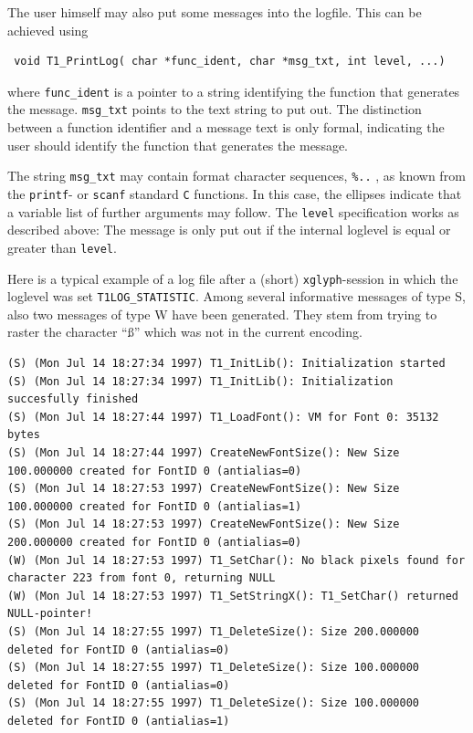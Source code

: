 The user himself may also put some messages into the logfile. This can be
achieved using
\precorr
\begin{verbatim}
 void T1_PrintLog( char *func_ident, char *msg_txt, int level, ...)
\end{verbatim}\postcorr
where \verb+func_ident+ is a pointer to a string identifying the function that
generates the message. \verb+msg_txt+ points to the text string to put
out. The distinction between a function identifier and a message text is only
formal, indicating the user should identify the function that generates the
message. 

The string \verb+msg_txt+ may contain format character sequences, \verb+%..+ ,
as known from the \verb+printf+- or \verb+scanf+ standard \verb+C+
functions. In this case, the ellipses indicate that a variable list of further
arguments may follow. The \verb+level+ specification works as
described above: The message is only put out if the internal loglevel is
equal or greater than \verb+level+. 

Here is a typical example of a log file after a (short)
\verb+xglyph+-session in which the loglevel was set
\verb+T1LOG_STATISTIC+. Among several informative messages of type S, also two
messages of type W have been generated. They stem from trying to
raster the character ``\ss'' which was not in the current encoding. 
\par\noindent
{%
\tiny
\begin{verbatim}
(S) (Mon Jul 14 18:27:34 1997) T1_InitLib(): Initialization started 
(S) (Mon Jul 14 18:27:34 1997) T1_InitLib(): Initialization succesfully finished 
(S) (Mon Jul 14 18:27:44 1997) T1_LoadFont(): VM for Font 0: 35132 bytes 
(S) (Mon Jul 14 18:27:44 1997) CreateNewFontSize(): New Size 100.000000 created for FontID 0 (antialias=0) 
(S) (Mon Jul 14 18:27:53 1997) CreateNewFontSize(): New Size 100.000000 created for FontID 0 (antialias=1) 
(S) (Mon Jul 14 18:27:53 1997) CreateNewFontSize(): New Size 200.000000 created for FontID 0 (antialias=0) 
(W) (Mon Jul 14 18:27:53 1997) T1_SetChar(): No black pixels found for character 223 from font 0, returning NULL 
(W) (Mon Jul 14 18:27:53 1997) T1_SetStringX(): T1_SetChar() returned NULL-pointer! 
(S) (Mon Jul 14 18:27:55 1997) T1_DeleteSize(): Size 200.000000 deleted for FontID 0 (antialias=0) 
(S) (Mon Jul 14 18:27:55 1997) T1_DeleteSize(): Size 100.000000 deleted for FontID 0 (antialias=0) 
(S) (Mon Jul 14 18:27:55 1997) T1_DeleteSize(): Size 100.000000 deleted for FontID 0 (antialias=1) 
\end{verbatim}
}

